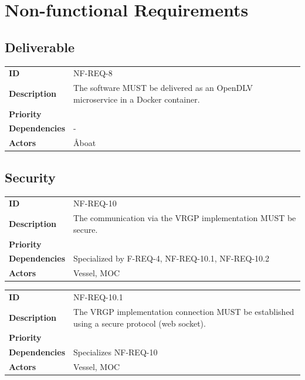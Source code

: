 \section{Non-functional Requirements}\label{sec:non-func-requirements}

\subsection{Deliverable}

\begin{table}[H]
	\centering
	\begin{tabularx}{\textwidth}{ l X }
		\rowcolor[HTML]{E7E7E7}
		\textbf{ID} & NF-REQ-8 \\
		\textbf{Description} & The software MUST be delivered as an OpenDLV microservice in a Docker container. \\
		\rowcolor[HTML]{E7E7E7}
		\textbf{Priority} & \priohigh \\
		\textbf{Dependencies} & - \\
		\rowcolor[HTML]{E7E7E7}
		\textbf{Actors} & Åboat \\
	\end{tabularx}
	\label{table:nf-req-8}
\end{table}

\subsection{Security}

\begin{table}[H]
	\centering
	\begin{tabularx}{\textwidth}{ l X }
		\rowcolor[HTML]{E7E7E7}
		\textbf{ID} & NF-REQ-10 \\
		\textbf{Description} & The communication via the VRGP implementation MUST be secure. \\
		\rowcolor[HTML]{E7E7E7}
		\textbf{Priority} & \priohigh \\
		\textbf{Dependencies} & Specialized by F-REQ-4, NF-REQ-10.1, NF-REQ-10.2 \\
		\rowcolor[HTML]{E7E7E7}
		\textbf{Actors} & Vessel, MOC \\
	\end{tabularx}
	\label{table:nf-req-10}
\end{table}

\begin{table}[H]
	\centering
	\begin{tabularx}{\textwidth}{ l X }
		\rowcolor[HTML]{E7E7E7}
		\textbf{ID} & NF-REQ-10.1 \\
		\textbf{Description} & The VRGP implementation connection MUST be established using a secure protocol (web socket). \\
		\rowcolor[HTML]{E7E7E7}
		\textbf{Priority} & \priohigh \\
		\textbf{Dependencies} & Specializes NF-REQ-10 \\
		\rowcolor[HTML]{E7E7E7}
		\textbf{Actors} & Vessel, MOC \\
	\end{tabularx}
	\label{table:nf-req-10.1}
\end{table}

